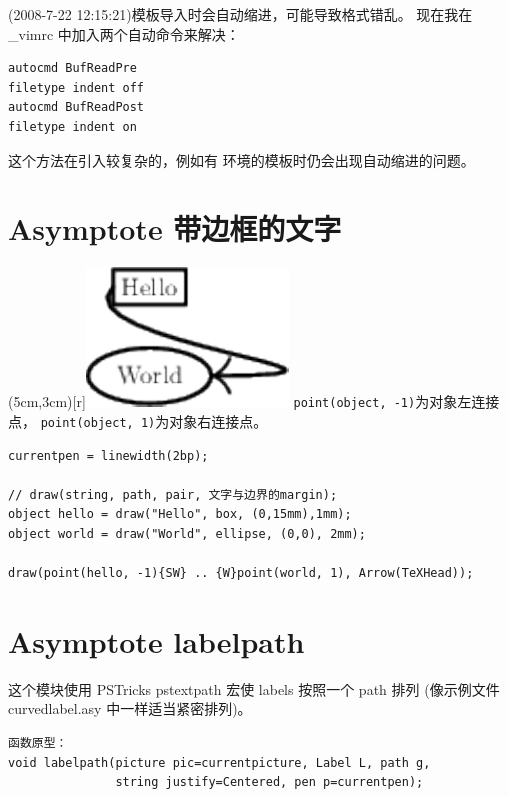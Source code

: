 \documentclass[a4paper,11pt]{article}
\begin{document}
(2008-7-22 12:15:21)模板导入时会自动缩进，可能导致格式错乱。
现在我在 \_vimrc 中加入两个自动命令来解决：
\begin{Verbatim}
autocmd BufReadPre
filetype indent off
autocmd BufReadPost
filetype indent on
\end{Verbatim}
这个方法在引入较复杂的，例如有  环境的模板时仍会出现自动缩进的问题。

\section{Asymptote 带边框的文字}
\parpic(5cm,3cm)[r]{\includegraphics{./figs/string_label.pdf}}
\verb+point(object, -1)+为对象左连接点，
\verb+point(object, 1)+为对象右连接点。
\begin{Verbatim}
currentpen = linewidth(2bp);

// draw(string, path, pair, 文字与边界的margin);
object hello = draw("Hello", box, (0,15mm),1mm);
object world = draw("World", ellipse, (0,0), 2mm);

draw(point(hello, -1){SW} .. {W}point(world, 1), Arrow(TeXHead));
\end{Verbatim}

\section{Asymptote labelpath}
这个模块使用 PSTricks pstextpath 宏使 labels 按照一个 path 排列%
(像示例文件 curvedlabel.asy 中一样适当紧密排列)。

\begin{Verbatim}
函数原型：
void labelpath(picture pic=currentpicture, Label L, path g,
               string justify=Centered, pen p=currentpen);
\end{Verbatim}
\end{document}
